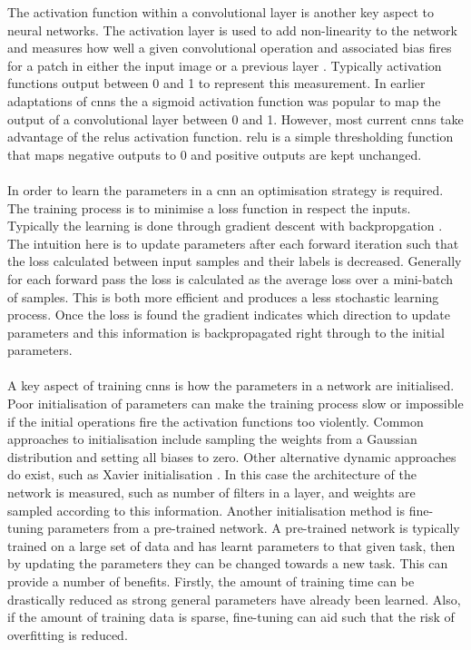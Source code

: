 The activation function within a convolutional layer is another key aspect to neural networks. The activation layer is used to add non-linearity to the network and measures how well a given convolutional operation and associated bias fires for a patch in either the input image or a previous layer \cite{cs321n}. Typically activation functions output between 0 and 1 to represent this measurement. In earlier adaptations of \glspl{cnn} the a sigmoid activation function was popular to map the output of a convolutional layer between 0 and 1. However, most current \glspl{cnn} take advantage of the \glspl{relu} activation function. \gls{relu} is a simple thresholding function that maps negative outputs to 0 and positive outputs are kept unchanged.
\\\\
In order to learn the parameters in a \gls{cnn} an optimisation strategy is required. The training process is to minimise a loss function in respect the inputs. Typically the learning is done through gradient descent with backpropgation \cite{cs321n}. The intuition here is to update parameters after each forward iteration such that the loss calculated between input samples and their labels is decreased. Generally for each forward pass the loss is calculated as the average loss over a mini-batch of samples. This is both more efficient and produces a less stochastic learning process. Once the loss is found the gradient indicates which direction to update parameters and this information is backpropagated right through to the initial parameters.
\\\\
A key aspect of training \glspl{cnn} is how the parameters in a network are initialised. Poor initialisation of parameters can make the training process slow or impossible if the initial operations fire the activation functions too violently. Common approaches to initialisation include sampling the weights from a Gaussian distribution and setting all biases to zero. Other alternative dynamic approaches do exist, such as Xavier initialisation \cite{xavier}. In this case the architecture of the network is measured, such as number of filters in a layer, and weights are sampled according to this information. Another initialisation method is fine-tuning parameters from a pre-trained network. A pre-trained network is typically trained on a large set of data and has learnt parameters to that given task, then by updating the parameters they can be changed towards a new task. This can provide a number of benefits. Firstly, the amount of training time can be drastically reduced as strong general parameters have already been learned. Also, if the amount of training data is sparse, fine-tuning can aid such that the risk of overfitting is reduced.
